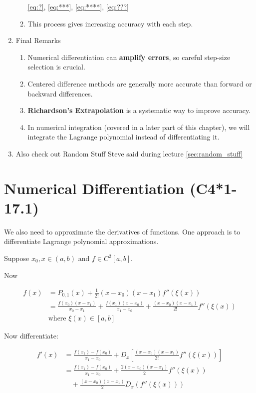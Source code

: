 \begin{enumerate}
\begin{enumerate}[label=(\alph*)]
        \eqref{eq:?}, \eqref{eq:***}, \eqref{eq:****}, \eqref{eq:???}
      \item This process gives increasing accuracy with each step.
    \end{enumerate}
  \item Final Remarks
    \begin{enumerate}[label=(\alph*)]
      \item Numerical differentiation can \textbf{amplify errors}, so careful
        step-size selection is crucial.
      \item Centered difference methods are generally more accurate than forward
        or backward differences.
      \item \textbf{Richardson's Extrapolation} is a systematic way to improve
        accuracy.
      \item In numerical integration (covered in a later part of this chapter),
        we will integrate the Lagrange polynomial instead of differentiating it.
    \end{enumerate}
  \item Also check out Random Stuff Steve said during lecture \ref{sec:random_stuff}
\end{enumerate}

\section{Numerical Differentiation (C4*1-17.1)}\label{sec:numerical_differentiation}

We also need to approximate the derivatives of functions. One approach is to
differentiate Lagrange polynomial approximations.

Suppose $x_0, x \in (a, b)$ and $f\in C^2[a,b]$.

Now

\begin{align*}
    f(x) &= P_{0,1}(x) + \frac{1}{2!} (x - x_0)(x - x_1) f''(\xi(x)) \\
         &= \frac{f(x_0)(x - x_1)}{x_0 - x_1} + \frac{f(x_1)(x - x_0)}{x_1 - x_0} 
         + \frac{(x - x_0)(x - x_1)}{2!} f''(\xi(x)) \\
         &\text{where } \xi(x) \in [a, b]
\end{align*}

Now differentiate:

\begin{align*}
    f'(x) &= \frac{f(x_1) - f(x_0)}{x_1 - x_0} + D_x \left[ \frac{(x - x_0)(x - x_1)}{2!} f''(\xi(x)) \right] \\
          &= \frac{f(x_1) - f(x_0)}{x_1 - x_0} + \frac{2 (x - x_0)(x - x_1)}{2} f''(\xi(x)) \\
          &\quad + \frac{(x - x_0)(x - x_1)}{2} D_x \left( f''(\xi(x)) \right)
\end{align*}

